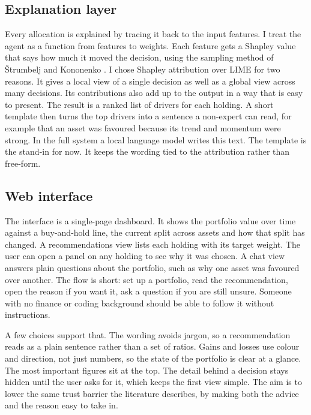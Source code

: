 \documentclass[12pt,twoside,letterpaper]{article}
\begin{document}
\subsection{Explanation layer}

Every allocation is explained by tracing it back to the input features. I treat the
agent as a function from features to weights. Each feature gets a Shapley value that
says how much it moved the decision, using the sampling method of \v{S}trumbelj and
Kononenko \cite{strumbelj2014}. I chose Shapley attribution over LIME for two
reasons. It gives a local view of a single decision as well as a global view across
many decisions. Its contributions also add up to the output in a way that is easy to
present. The result is a ranked list of drivers for each holding. A short template
then turns the top drivers into a sentence a non-expert can read, for example that
an asset was favoured because its trend and momentum were strong. In the full system
a local language model writes this text. The template is the stand-in for now. It
keeps the wording tied to the attribution rather than free-form.

\subsection{Web interface}

The interface is a single-page dashboard. It shows the portfolio value over time
against a buy-and-hold line, the current split across assets and how that split has
changed. A recommendations view lists each holding with its target weight. The user
can open a panel on any holding to see why it was chosen. A chat view answers plain
questions about the portfolio, such as why one asset was favoured over another. The
flow is short: set up a portfolio, read the recommendation, open the reason if you
want it, ask a question if you are still unsure. Someone with no finance or coding
background should be able to follow it without instructions.

A few choices support that. The wording avoids jargon, so a recommendation reads as
a plain sentence rather than a set of ratios. Gains and losses use colour and
direction, not just numbers, so the state of the portfolio is clear at a glance. The
most important figures sit at the top. The detail behind a decision stays hidden
until the user asks for it, which keeps the first view simple. The aim is to lower
the same trust barrier the literature describes, by making both the advice and the
reason easy to take in.
\end{document}
